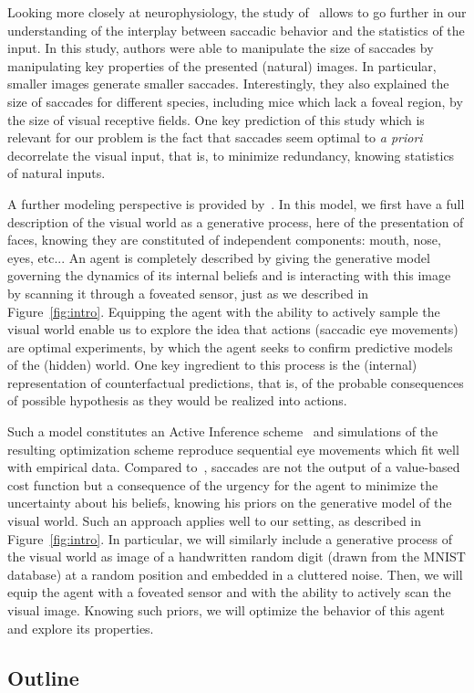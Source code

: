 Looking more closely at neurophysiology, the study of~\citep{Samonds18} allows to go further in our understanding of the interplay between saccadic behavior and the statistics of the input. In this study, authors were able to manipulate the size of saccades by manipulating key properties of the presented (natural) images. In particular, smaller images generate smaller saccades. Interestingly, they also explained the size of saccades for different species, including mice which lack a foveal region, by the size of visual receptive fields. One key prediction of this study which is relevant for our problem is the fact that saccades seem optimal to \emph{a priori} decorrelate the visual input, that is, to minimize redundancy, knowing statistics of natural inputs.

A further modeling perspective is provided by~\citep{Friston12}. In this model, we first have a full description of the visual world as a generative process, here of the presentation of faces, knowing they are constituted of independent components: mouth, nose, eyes, etc... An agent is completely described by giving the generative model governing the dynamics of its internal beliefs and is interacting with this image by scanning it through a foveated sensor, just as we described in Figure~\ref{fig:intro}. Equipping the agent with the ability to actively sample the visual world enable us to explore the idea that actions (saccadic eye movements) are optimal experiments, by which the agent seeks to confirm predictive models of the (hidden) world. One key ingredient to this process is the (internal) representation of counterfactual predictions, that is, of the probable consequences of possible hypothesis as they would be realized into actions.

Such a model constitutes an Active Inference scheme~\citep{Mirza18} and simulations of the resulting optimization scheme reproduce sequential eye movements which fit well with empirical data. Compared to~\citet{Najemnik05}, saccades are not the output of a value-based cost function but a consequence of the urgency for the agent to minimize the uncertainty about his beliefs, knowing his priors on the generative model of the visual world. Such an approach applies well to our setting, as described in Figure~\ref{fig:intro}. In particular, we will similarly include a generative process of the visual world as image of a handwritten random digit (drawn from the MNIST database) at a random position and embedded in a cluttered noise. Then, we will equip the agent with a foveated sensor and with the ability to actively scan the visual image. Knowing such priors, we will optimize the behavior of this agent and explore its properties.

\subsection{Outline}
